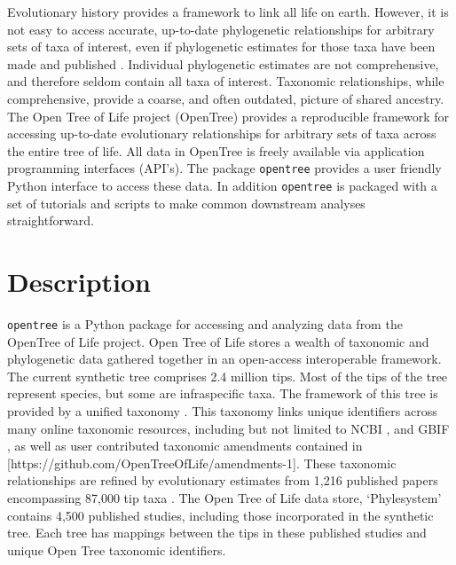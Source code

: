 \documentclass[oupdraft]{sysbio_sse}
\begin{document}
Evolutionary history provides a framework to link all life on earth. However, it is not easy to access accurate, up-to-date phylogenetic relationships for arbitrary sets of taxa of interest, even if phylogenetic estimates for those taxa have been made and published \citep{drew_lost_2013, mctavish_how_2017}. Individual phylogenetic estimates are not comprehensive, and therefore seldom contain all taxa of interest. Taxonomic relationships, while comprehensive, provide a coarse, and often outdated, picture of shared ancestry.
The Open Tree of Life project (OpenTree) provides a reproducible framework for accessing up-to-date evolutionary relationships for arbitrary sets of taxa across the entire tree of life.
All data in OpenTree is freely available via application programming interfaces (API's).
The package \texttt{opentree} provides a user friendly Python interface to access these data. In addition \texttt{opentree} is packaged with a set of tutorials and scripts to make common downstream analyses straightforward.

\bigskip
\section{Description}
\label{sec2}

\texttt{opentree} is a Python package for accessing and analyzing data from the OpenTree of Life project.
Open Tree of Life stores a wealth of taxonomic and phylogenetic data gathered together in an open-access interoperable framework.
The current synthetic tree \citep{opentreeoflife_open_2019} comprises 2.4 million tips.
Most of the tips of the tree represent species, but some are infraspecific taxa.
The framework of this tree is provided by a unified taxonomy \citep{opentreeoflife_open_2019-1, rees_automated_2017}.
This taxonomy links unique identifiers across many online taxonomic resources, including but not limited to NCBI \citep{federhen_ncbi_2012}, and GBIF \citep{gbif_secretariat_gbif_2019}, as well as user contributed taxonomic amendments contained in [https://github.com/OpenTreeOfLife/amendments-1].
These taxonomic relationships are refined by evolutionary estimates from 1,216 published papers encompassing 87,000 tip taxa \citep{opentreeoflife_open_2019, redelings_supertree_2017}.
The Open Tree of Life data store, `Phylesystem' \citep{mctavish_phylesystem_2015} contains 4,500 published studies, including those incorporated in the synthetic tree. Each tree has mappings between the tips in these published studies and unique Open Tree taxonomic identifiers.
\end{document}
